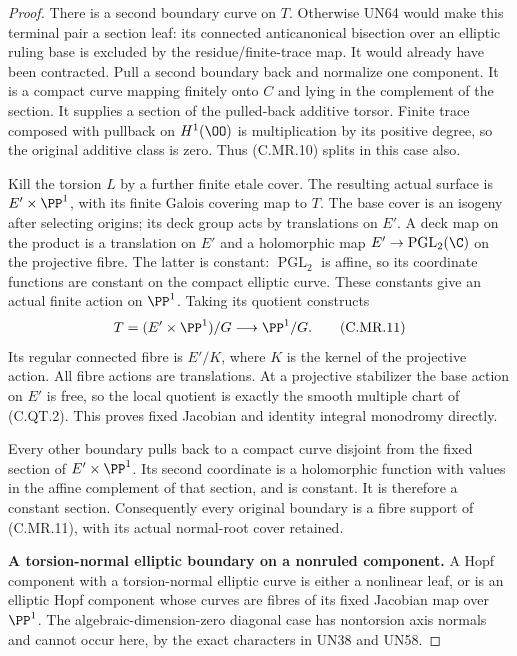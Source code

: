 \begin{proof}
There is a second boundary curve on $T$.
Otherwise UN64 would make this terminal pair
a section leaf: its connected anticanonical
bisection over an elliptic ruling base is
excluded by the residue/finite-trace map.
It would already have been contracted.
Pull a second boundary back and normalize
one component. It is a compact curve mapping
finitely onto $C$ and lying in the complement
of the section. It supplies a section of
the pulled-back additive torsor. Finite
trace composed with pullback on $H^1(\OO)$
is multiplication by its positive degree,
so the original additive class is zero.
Thus (C.MR.10) splits in this case also.

Kill the torsion $L$ by a further finite
etale cover. The resulting actual surface
is $E'\times\PP^1$, with its finite Galois
covering map to $T$. The base cover is
an isogeny after selecting origins; its
deck group acts by translations on $E'$.
A deck map on the product is a translation
on $E'$ and a holomorphic map
$E'\to\operatorname{PGL}_2(\C)$ on the
projective fibre. The latter is constant:
$\operatorname{PGL}_2$ is affine, so its
coordinate functions are constant on the
compact elliptic curve. These constants
give an actual finite action on $\PP^1$.
Taking its quotient constructs
\[
        T=(E'\times\PP^1)/G
                         \longrightarrow\PP^1/G.
\tag{C.MR.11}
\]
Its regular connected fibre is $E'/K$,
where $K$ is the kernel of the projective
action. All fibre actions are translations.
At a projective stabilizer the base action
on $E'$ is free, so the local quotient
is exactly the smooth multiple chart
of (C.QT.2). This proves fixed Jacobian
and identity integral monodromy directly.

Every other boundary pulls back to a
compact curve disjoint from the fixed
section of $E'\times\PP^1$. Its second
coordinate is a holomorphic function
with values in the affine complement
of that section, and is constant.
It is therefore a constant section.
Consequently every original boundary
is a fibre support of (C.MR.11), with
its actual normal-root cover retained.

\par\medskip\noindent\textbf{A torsion-normal elliptic boundary on a nonruled component.}
A Hopf component with a torsion-normal
elliptic curve is either a nonlinear
leaf, or is an elliptic Hopf component
whose curves are fibres of its fixed
Jacobian map over $\PP^1$. The
algebraic-dimension-zero diagonal case
has nontorsion axis normals and cannot
occur here, by the exact characters
in UN38 and UN58.


\end{proof}
